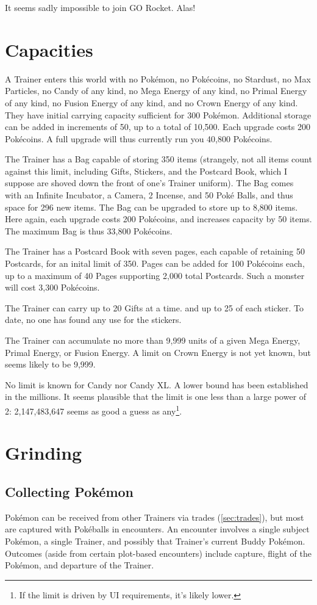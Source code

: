 It seems sadly impossible to join GO Rocket. Alas!

\section{Capacities}
A Trainer enters this world with no Pokémon, no Pokécoins, no Stardust,
  no Max Particles, no Candy of any kind, no Mega Energy of any kind,
  no Primal Energy of any kind, no Fusion Energy of any kind, and no Crown
  Energy of any kind.
They have initial carrying capacity sufficient for 300 Pokémon.
Additional storage can be added in increments of 50, up to a total of 10,500.
Each upgrade costs 200 Pokécoins.
A full upgrade will thus currently run you 40,800 Pokécoins.

The Trainer has a Bag capable of storing 350 items (strangely, not all items
  count against this limit, including Gifts, Stickers, and the Postcard Book,
  which I suppose are shoved down the front of one's Trainer uniform).
The Bag comes with an Infinite Incubator, a Camera, 2 Incense, and 50 Poké Balls,
  and thus space for 296 new items.
The Bag can be upgraded to store up to 8,800 items.
Here again, each upgrade costs 200 Pokécoins, and increases capacity by 50 items.
The maximum Bag is thus 33,800 Pokécoins.

The Trainer has a Postcard Book with seven pages, each capable of retaining
 50 Postcards, for an inital limit of 350.
Pages can be added for 100 Pokécoins each, up to a maximum of 40 Pages
 supporting 2,000 total Postcards.
Such a monster will cost 3,300 Pokécoins.

The Trainer can carry up to 20 Gifts at a time. and up to 25 of each sticker.
To date, no one has found any use for the stickers.

The Trainer can accumulate no more than 9,999 units of a given Mega Energy,
 Primal Energy, or Fusion Energy.
A limit on Crown Energy is not yet known, but seems likely to be 9,999.

No limit is known for Candy nor Candy XL.
A lower bound has been established in the millions.
It seems plausible that the limit is one less than a large power of 2:
  2,147,483,647 seems as good a guess as any\footnote{If the limit is driven by UI requirements, it's likely lower.}.

\section{Grinding}
\subsection{Collecting Pokémon}
\label{subsec:getmons}
Pokémon can be received from other Trainers via trades (\autoref{sec:trades}),
  but most are captured with Pokéballs in encounters.
An encounter involves a single subject Pokémon, a single Trainer,
  and possibly that Trainer's current Buddy Pokémon.
Outcomes (aside from certain plot-based encounters) include capture, flight of
  the Pokémon, and departure of the Trainer.

